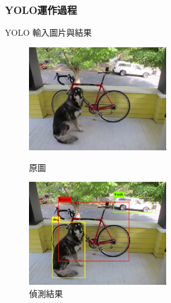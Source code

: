 
\subsubsection{YOLO運作過程}

YOLO 輸入圖片與結果

\begin{figure}[htbp]
\centering
\begin{minipage}[t]{0.48\textwidth}
\centering
\includegraphics[width=6cm]{fig/ch3_1.png}
\caption{原圖}
\end{minipage}
\begin{minipage}[t]{0.48\textwidth}
\centering
\includegraphics[width=6cm]{fig/ch3_2.png}
\caption{偵測結果}
\end{minipage}
\end{figure}
